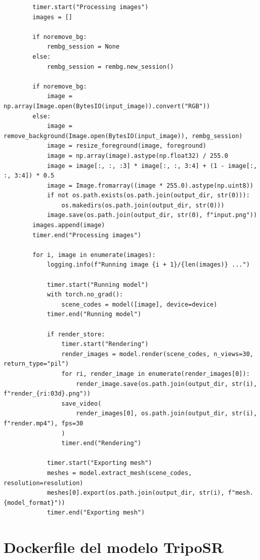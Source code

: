\begin{verbatim}
        timer.start("Processing images")
        images = []
    
        if noremove_bg:
            rembg_session = None
        else:
            rembg_session = rembg.new_session()
    
        if noremove_bg:
            image = np.array(Image.open(BytesIO(input_image)).convert("RGB"))
        else:
            image = remove_background(Image.open(BytesIO(input_image)), rembg_session)
            image = resize_foreground(image, foreground)
            image = np.array(image).astype(np.float32) / 255.0
            image = image[:, :, :3] * image[:, :, 3:4] + (1 - image[:, :, 3:4]) * 0.5
            image = Image.fromarray((image * 255.0).astype(np.uint8))
            if not os.path.exists(os.path.join(output_dir, str(0))):
                os.makedirs(os.path.join(output_dir, str(0)))
            image.save(os.path.join(output_dir, str(0), f"input.png"))
        images.append(image)
        timer.end("Processing images")
    
        for i, image in enumerate(images):
            logging.info(f"Running image {i + 1}/{len(images)} ...")
    
            timer.start("Running model")
            with torch.no_grad():
                scene_codes = model([image], device=device)
            timer.end("Running model")
    
            if render_store:
                timer.start("Rendering")
                render_images = model.render(scene_codes, n_views=30, return_type="pil")
                for ri, render_image in enumerate(render_images[0]):
                    render_image.save(os.path.join(output_dir, str(i), f"render_{ri:03d}.png"))
                save_video(
                    render_images[0], os.path.join(output_dir, str(i), f"render.mp4"), fps=30
                )
                timer.end("Rendering")
    
            timer.start("Exporting mesh")
            meshes = model.extract_mesh(scene_codes, resolution=resolution)
            meshes[0].export(os.path.join(output_dir, str(i), f"mesh.{model_format}"))
            timer.end("Exporting mesh")
\end{verbatim}



\section{Dockerfile del modelo TripoSR}
\label{sec:puntoA6}
 
